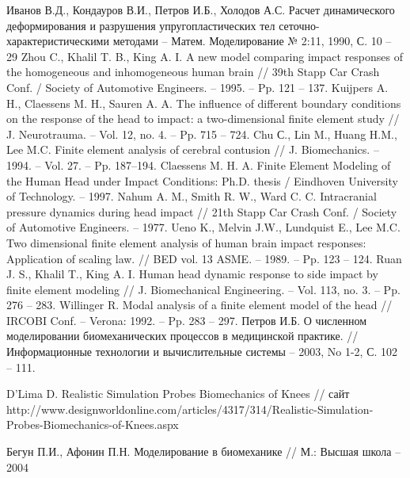 \begin{thebibliography}{99}
 Иванов В.Д., Кондауров В.И., Петров И.Б., Холодов А.С. Расчет динамического деформирования и разрушения упругопластических тел сеточно-характеристическими методами – Матем. Моделирование № 2:11, 1990, С. 10 – 29
 Zhou C., Khalil T. B., King A. I. A new model comparing impact responses of the homogeneous and inhomogeneous human brain // 39th Stapp Car Crash Conf. / Society of Automotive Engineers. – 1995. – Pp. 121 – 137.
 Kuijpers A. H., Claessens M. H., Sauren A. A. The influence of different boundary conditions on the response of the head to impact: a two-dimensional finite element study // J. Neurotrauma. – Vol. 12, no. 4. – Pp. 715 – 724.
 Chu С., Lin M., Huang H.M., Lee M.C. Finite element analysis of cerebral contusion // J. Biomechanics. – 1994. – Vol. 27. – Pp. 187–194.
 Claessens M. H. A. Finite Element Modeling of the Human Head under Impact Conditions: Ph.D. thesis / Eindhoven University of Technology. – 1997.
 Nahum A. M., Smith R. W., Ward C. C. Intracranial pressure dynamics during head impact // 21th Stapp Car Crash Conf. / Society of Automotive Engineers. – 1977. 
 Ueno K., Melvin J.W., Lundquist E., Lee M.C. Two dimensional finite element analysis of human brain impact responses: Application of scaling law. // BED vol. 13 ASME. – 1989. – Pp. 123 – 124. 
 Ruan J. S., Khalil T., King A. I. Human head dynamic response to side impact by finite element modeling // J. Biomechanical Engineering. – Vol. 113, no. 3. – Pp. 276 – 283. 
 Willinger R. Modal analysis of a finite element model of the head // IRCOBI Conf. – Verona: 1992. – Pp. 283 – 297.
 Петров И.Б. О численном моделировании биомеханических процессов в медицинской практике. // Информационные технологии и вычислительные системы – 2003, No 1-2, С. 102 – 111.

 D’Lima D. Realistic Simulation Probes Biomechanics of Knees // сайт http://www.designworldonline.com/articles/4317/314/Realistic-Simulation-Probes-Biomechanics-of-Knees.aspx

 Бегун П.И., Афонин П.Н. Моделирование в биомеханике // М.: Высшая школа -- 2004


\end{thebibliography}
